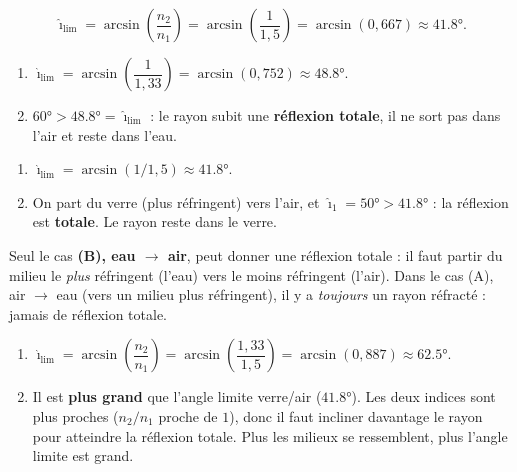 \documentclass[11pt,a4paper]{article}
\begin{document}
\begin{corrige}
\[ \hat{\imath}_{\text{lim}}=\arcsin\!\left(\frac{n_2}{n_1}\right)=\arcsin\!\left(\frac{1}{1{,}5}\right)
   =\arcsin(0{,}667)\approx\ang{41.8}. \]
\end{corrige}

\begin{corrige}
\begin{enumerate}[label=\alph*)]
  \item $\hat{\imath}_{\text{lim}}=\arcsin\!\left(\dfrac{1}{1{,}33}\right)=\arcsin(0{,}752)\approx\ang{48.8}$.
  \item $\ang{60}>\ang{48.8}=\hat{\imath}_{\text{lim}}$ : le rayon subit une \textbf{réflexion totale},
        il ne sort pas dans l'air et reste dans l'eau.
\end{enumerate}
\end{corrige}

\begin{corrige}
\begin{enumerate}[label=\alph*)]
  \item $\hat{\imath}_{\text{lim}}=\arcsin(1/1{,}5)\approx\ang{41.8}$.
  \item On part du verre (plus réfringent) vers l'air, et $\hat{\imath}_1=\ang{50}>\ang{41.8}$ : la
        réflexion est \textbf{totale}. Le rayon reste dans le verre.
\end{enumerate}
\end{corrige}

\begin{corrige}
Seul le cas \textbf{(B), eau $\to$ air}, peut donner une réflexion totale : il faut partir du milieu
le \emph{plus} réfringent (l'eau) vers le moins réfringent (l'air). Dans le cas (A), air $\to$ eau
(vers un milieu plus réfringent), il y a \emph{toujours} un rayon réfracté : jamais de réflexion totale.
\end{corrige}

\begin{corrige}
\begin{enumerate}[label=\alph*)]
  \item $\hat{\imath}_{\text{lim}}=\arcsin\!\left(\dfrac{n_2}{n_1}\right)=\arcsin\!\left(\dfrac{1{,}33}{1{,}5}\right)
        =\arcsin(0{,}887)\approx\ang{62.5}$.
  \item Il est \textbf{plus grand} que l'angle limite verre/air ($\ang{41.8}$). Les deux indices sont
        plus proches ($n_2/n_1$ proche de $1$), donc il faut incliner davantage le rayon pour atteindre
        la réflexion totale. Plus les milieux se ressemblent, plus l'angle limite est grand.
\end{enumerate}
\end{corrige}
\end{document}
